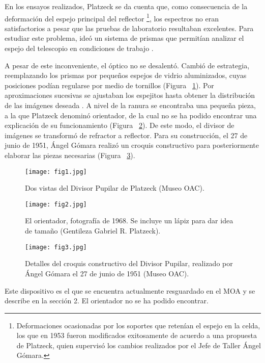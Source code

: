 \documentclass[baaa]{baaa}
\begin{document}
En los ensayos realizados, Platzeck se da cuenta que, como consecuencia de la deformación del espejo principal del reflector \footnote{Deformaciones ocasionadas por los soportes que retenían  el espejo en la celda, los que en 1953 fueron modificados exitosamente de acuerdo a una propuesta de Platzeck, quien supervisó los cambios realizados por el Jefe de Taller Ángel Gómara.}, los espectros no eran satisfactorios a pesar que las pruebas de laboratorio resultaban excelentes. Para estudiar este problema, ideó un sistema de prismas que permitían analizar el espejo del telescopio en condiciones de trabajo \citep{1951Platzeck_b}.
 
A pesar de este inconveniente, el óptico no se de\-sa\-len\-tó. Cambió de estrategia, reemplazando los prismas por pequeños espejos de vidrio aluminizados, cuyas posiciones podían regularse por medio de tornillos (Figura ~\ref{Figura1}). Por aproximaciones sucesivas se ajustaban los espejitos hasta obtener la distribución de las imágenes deseada  \citep{1953Platzeck}. A nivel de la ranura se encontraba una pequeña pieza, a la que Platzeck denominó orientador, de la cual no se ha podido encontrar una explicación de su funcionamiento (Figura ~\ref{Figura2}). De este modo, el divisor de imágenes se transformó de refractor a reflector. Para su construcción, el 27 de junio de 1951, Ángel Gómara realizó un croquis constructivo para posteriormente elaborar las piezas necesarias (Figura ~\ref{Figura3}).

\begin{figure}[!t]
\centering
\texttt{[image: fig1.jpg]}
\caption{Dos vistas del Divisor Pupilar de Platzeck (Museo OAC).}
\label{Figura1}
\end{figure}

\begin{figure}[!t]
\centering
\texttt{[image: fig2.jpg]}
\caption{El orientador, fotografía de 1968. Se incluye un lápiz para dar idea de tamaño (Gentileza Gabriel R. Platzeck).}
\label{Figura2}
\end{figure}

\begin{figure}[!t]
\centering
\texttt{[image: fig3.jpg]}
\caption{Detalles del croquis constructivo del Divisor Pupilar, realizado por Ángel Gómara el 27 de junio de 1951 (Museo OAC).}
\label{Figura3}
\end{figure}

Este dispositivo es el que se encuentra actualmente resguardado en el MOA y se describe en la sección 2. El orientador no se ha podido encontrar.
\end{document}
